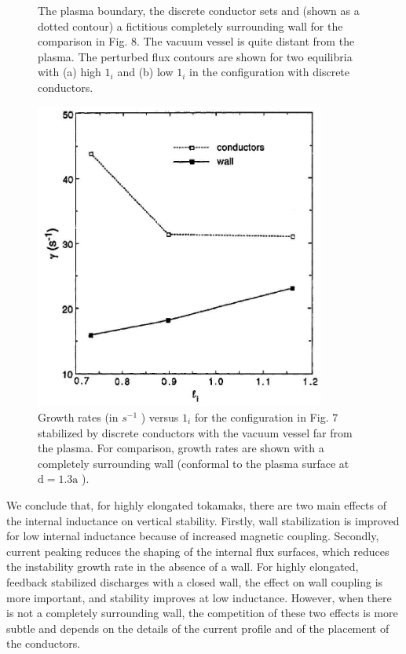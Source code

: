 \documentclass[utf8]{ctexart}
\begin{document}
\begin{sloppypar}
\begin{figure}[H]
 	\caption{The plasma boundary, the discrete conductor sets and (shown as a dotted contour) a fictitious completely surrounding wall for the comparison in Fig. 8. The vacuum vessel is quite distant from the plasma. The perturbed flux contours are shown for two equilibria with (a) high $1_{i}$ and (b) low $1_{i}$ in the configuration with discrete conductors.\\}
 	\label{fig7.}
 \end{figure}
 
  \begin{figure}[H]
 	\centering
 	\includegraphics[max width=0.85\textwidth,max height=0.3\textheight]{2025_01_10_a0135324997886412d98g-8}
 	\caption{Growth rates (in $s^{-1}$ ) versus $1_{i}$ for the configuration in Fig. 7 stabilized by discrete conductors with the vacuum vessel far from the plasma. For comparison, growth rates are shown with a completely surrounding wall (conformal to the plasma surface at $\mathrm{d}=1.3 \mathrm{a}$ ).\\}
 	\label{fig8.}
 \end{figure}
 

 
 We conclude that, for highly elongated tokamaks, there are two main effects of the internal inductance on vertical stability. Firstly, wall stabilization is improved for low internal inductance because of increased magnetic coupling. Secondly, current peaking reduces the shaping of the internal flux surfaces, which reduces the instability growth rate in the absence of a wall. For highly elongated, feedback stabilized discharges with a closed wall, the effect on wall coupling is more important, and stability improves at low inductance. However, when there is not a completely surrounding wall, the competition of these two effects is more subtle and depends on the details of the current profile and of the placement of the conductors.
 

\end{sloppypar}
\end{document}

